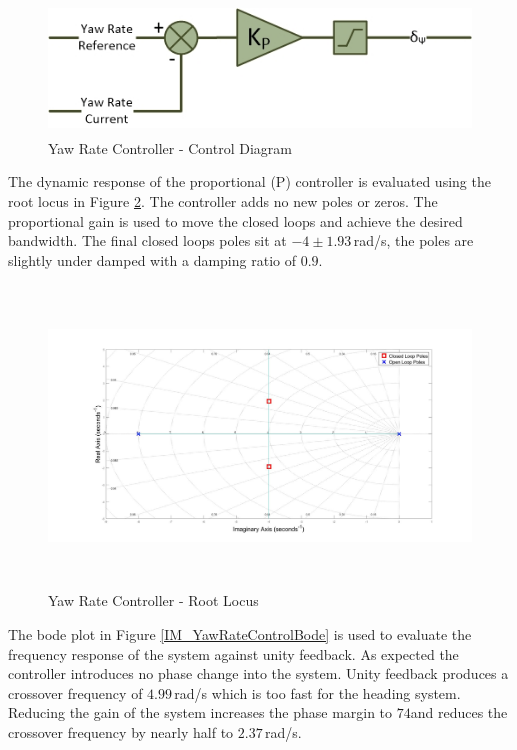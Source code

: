 	\begin{figure}[H]
		\centering
		\includegraphics[height = 3.5cm]{../References/Diagrams/YawRateController.jpg}
		\caption{Yaw Rate Controller -  Control Diagram}
		\label{IM_YawRateController}
	\end{figure}
	
	The dynamic response of the proportional (P) controller is evaluated using the root locus in Figure \ref{IM_YawRateControlRoot}. The controller adds no new poles or zeros. The proportional gain is used to move the closed loops and achieve the desired bandwidth. The final closed loops poles sit at $-4 \pm 1.93$\,rad/s, the poles are slightly under damped with a damping ratio of $0.9$.
	
	\begin{figure}[H]
		\centering
		\includegraphics[height = 8cm]{../Design/Matlab/Controllers/yaw_rate_root.jpg}
		\caption{Yaw Rate Controller -  Root Locus}
		\label{IM_YawRateControlRoot}
	\end{figure}
	
	The bode plot in Figure \ref{IM_YawRateControlBode} is used to evaluate the frequency response of the system against unity feedback. As expected the controller introduces no phase change into the system. Unity feedback produces a crossover frequency of $4.99$\,rad/s which is too fast for the heading system. Reducing the gain of the system increases the phase margin to $74$\textdegree and reduces the crossover frequency by nearly half to $2.37$\,rad/s.
	
